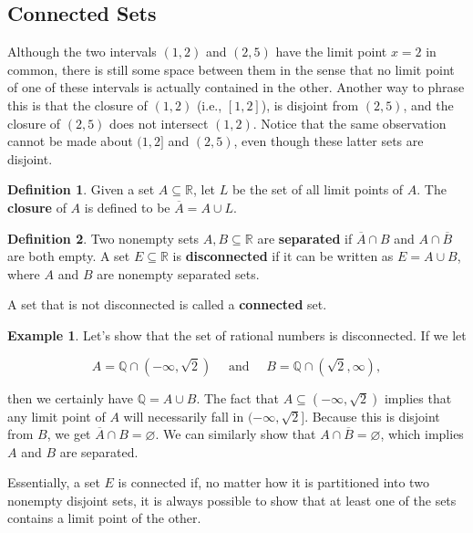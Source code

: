 \documentclass{article}
\theoremstyle{definition}
\newtheorem{definition}{Definition}[section]
\theoremstyle{remark}
\theoremstyle{definition}
\newtheorem{example}{Example}[section]
\begin{document}
\newpage

\subsection{Connected Sets}

Although the two intervals $(1,2)$ and $(2,5)$ have the limit point $x=2$ in common, there is still some space between them in the sense that no limit point of one of these intervals is actually contained in the other. Another way to phrase this is that the closure of $(1,2)$ (i.e., $[1,2]$), is disjoint from $(2,5)$, and the closure of $(2,5)$ does not intersect $(1,2)$. Notice that the same observation cannot be made about $(1,2]$ and $(2,5)$, even though these latter sets are disjoint.

\begin{definition}
    Given a set $A\subseteq\mathbb{R}$, let $L$ be the set of all limit points of $A$. The \textbf{closure} of $A$ is defined to be $\overline{A}=A\cup L$.
\end{definition}

\begin{definition}
    Two nonempty sets $A,B\subseteq\mathbb{R}$ are \textbf{separated} if $\overline{A}\cap B$ and $A\cap\overline{B}$ are both empty. A set $E\subseteq\mathbb{R}$ is \textbf{disconnected} if it can be written as $E=A\cup B$, where $A$ and $B$ are nonempty separated sets.\par 
    A set that is not disconnected is called a \textbf{connected} set.
\end{definition}

\begin{example}
    Let's show that the set of rational numbers is disconnected. If we let 
    
    \begin{equation*}
        A=\mathbb{Q}\cap(-\infty,\sqrt{2})\quad\text{ and }\quad B=\mathbb{Q}\cap(\sqrt{2},\infty),
    \end{equation*}
    
    \noindent then we certainly have $\mathbb{Q}=A\cup B$. The fact that $A\subseteq(-\infty,\sqrt{2})$ implies that any limit point of $A$ will necessarily fall in $(-\infty, \sqrt{2}]$. Because this is disjoint from $B$, we get $\overline{A}\cap B=\varnothing$. We can similarly show that $A\cap\overline{B}=\varnothing$, which implies $A$ and $B$ are separated.
\end{example}

Essentially, a set $E$ is connected if, no matter how it is partitioned into two nonempty disjoint sets, it is always possible to show that at least one of the sets contains a limit point of the other.
\end{document}
